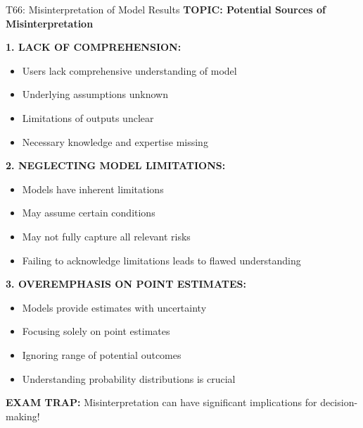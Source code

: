 \documentclass[8pt]{beamer}
\begin{document}
	
	\begin{frame}{T66: Misinterpretation of Model Results}
		\fontsize{6.5}{7.5}\selectfont
		\textbf{TOPIC: Potential Sources of Misinterpretation}
		
		\vspace{0.1cm}
		\textbf{1. LACK OF COMPREHENSION:}
		\begin{itemize}
			\item Users lack comprehensive understanding of model
			\item Underlying assumptions unknown
			\item Limitations of outputs unclear
			\item Necessary knowledge and expertise missing
		\end{itemize}
		
		\vspace{0.1cm}
		\textbf{2. NEGLECTING MODEL LIMITATIONS:}
		\begin{itemize}
			\item Models have inherent limitations
			\item May assume certain conditions
			\item May not fully capture all relevant risks
			\item Failing to acknowledge limitations leads to flawed understanding
		\end{itemize}
		
		\vspace{0.1cm}
		\textbf{3. OVEREMPHASIS ON POINT ESTIMATES:}
		\begin{itemize}
			\item Models provide estimates with uncertainty
			\item Focusing solely on point estimates
			\item Ignoring range of potential outcomes
			\item Understanding probability distributions is crucial
		\end{itemize}
		
		\textcolor{myred}{\textbf{EXAM TRAP:}} Misinterpretation can have \textcolor{myblue}{significant implications for decision-making}!
	\end{frame}
	
\end{document}
